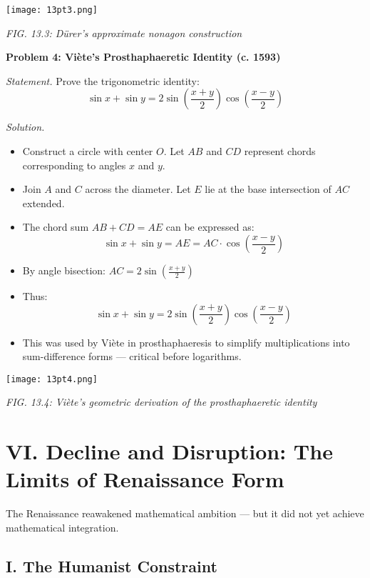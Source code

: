 \documentclass[9pt]{article}
\begin{document}
\begin{center}
    \texttt{[image: 13pt3.png]}

    \textit{FIG. 13.3: Dürer’s approximate nonagon construction}
\end{center}

\newpage

\textbf{Problem 4: Viète’s Prosthaphaeretic Identity (c. 1593)}

\textit{Statement.} Prove the trigonometric identity:
\[
\sin x + \sin y = 2 \sin\left(\frac{x + y}{2}\right)\cos\left(\frac{x - y}{2}\right)
\]

\textit{Solution.}
\begin{itemize}
    \item Construct a circle with center $O$. Let $AB$ and $CD$ represent chords corresponding to angles $x$ and $y$.
    \item Join $A$ and $C$ across the diameter. Let $E$ lie at the base intersection of $AC$ extended.
    \item The chord sum $AB + CD = AE$ can be expressed as:
    \[
    \sin x + \sin y = AE = AC \cdot \cos\left(\frac{x - y}{2}\right)
    \]
    \item By angle bisection: $AC = 2 \sin\left(\frac{x + y}{2}\right)$
    \item Thus:
    \[
    \sin x + \sin y = 2 \sin\left(\frac{x + y}{2}\right)\cos\left(\frac{x - y}{2}\right)
    \]
    \item This was used by Viète in prosthaphaeresis to simplify multiplications into sum-difference forms — critical before logarithms.
\end{itemize}

\begin{center}
    \texttt{[image: 13pt4.png]}

    \textit{FIG. 13.4: Viète’s geometric derivation of the prosthaphaeretic identity}
\end{center}


\newpage

\section*{VI. Decline and Disruption: The Limits of Renaissance Form}

The Renaissance reawakened mathematical ambition — but it did not yet achieve mathematical integration.

\subsection*{I. The Humanist Constraint}
\end{document}
